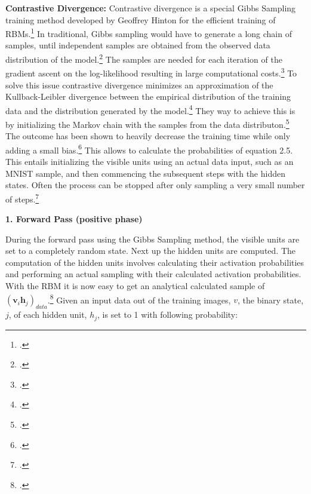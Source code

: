 \textbf{Contrastive Divergence:} Contrastive divergence is a special Gibbs Sampling training method
developed by Geoffrey Hinton for the efficient training of \ac{RBM}s.\footcite[cf.][4-5]{hintonPracticalGuideTraining2012}
In traditional, Gibbs sampling would have to generate a long chain of samples, until
independent samples are obtained from the observed data distribution of the model.\footcite[cf.][5-6]{huembeliPhysicsEnergybasedModels2022}
The samples are needed for each iteration of the gradient ascent on the log-likelihood
resulting in large computational costs.\footcite[cf.][7-8]{upadhyaOverviewRestrictedBoltzmann2019}
To solve this issue contrastive divergence minimizes an approximation of the Kullback-Leibler divergence between the empirical distribution of the training data and the distribution generated by the model.\footcite[cf.][246]{mocanuTopologicalInsightRestricted2016}
They way to achieve this is by initializing the Markov chain with the samples from the data distributon.\footcite[cf.][7-8]{upadhyaOverviewRestrictedBoltzmann2019}
The outcome has been shown to heavily decrease the training time while only adding a small bias.\footcite[cf.][537]{larochelleClassificationUsingDiscriminative2008}
This allows to calculate the probabilities of equation 2.5. 
This entails initializing the visible units using an actual data input, such as an MNIST sample, and then commencing the subsequent steps with the hidden states.
Often the process can be stopped after only sampling a very small number of steps.\footcite[cf.][646]{larochelleLearningAlgorithmsClassification2012}


\textbf{1. Forward Pass (positive phase)}

During the forward pass using the Gibbs Sampling method, the visible units are set to a completely random state. Next up the hidden units are computed.
The computation of the hidden units involves calculating their activation probabilities and performing an actual sampling with their calculated activation probabilities.
With the \ac{RBM} it is now easy to get an analytical calculated sample of $(\textbf{v}_i\textbf{h}_j)_{data}$.\footcite[cf.][5]{hintonPracticalGuideTraining2012}
Given an input data out of the training images, \( v \), the binary state, \( j \), of each hidden unit,  \( h_j \), is set to 1 with following probability:

